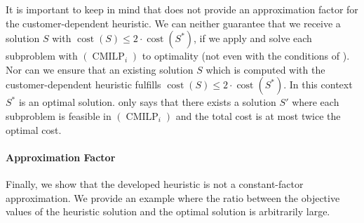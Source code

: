 It is important to keep in mind that  does not provide an approximation factor for the customer-dependent heuristic. We can neither guarantee that we receive a solution $S$ with ${\operatorname{cost}\left(S\right)\leq 2\cdot\operatorname{cost}\left(S^*\right)}$, if we apply  and solve each subproblem with $(\operatorname{CMILP}_i)$ to optimality (not even with the conditions of ). Nor can we ensure that an existing solution $S$ which is computed with the customer-dependent heuristic fulfills ${\operatorname{cost}\left(S\right)\leq 2\cdot\operatorname{cost}\left(S^*\right)}$. In this context $S^*$ is an optimal solution.  only says that there exists a solution $S'$ where each subproblem is feasible in $(\operatorname{CMILP}_i)$ and the total cost is at most twice the optimal cost.

\paragraph{Approximation Factor} \parfill

Finally, we show that the developed heuristic is not a constant-factor approximation. We provide an example where the ratio between the objective values of the heuristic solution and the optimal solution is arbitrarily large.

